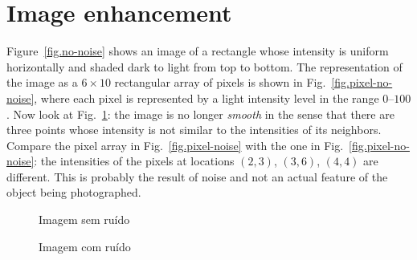 \section{Image enhancement}\label{s.enhance}

Figure~\ref{fig.no-noise} shows an image of a rectangle whose intensity is uniform horizontally and shaded dark to light from top to bottom. The representation of the image as a $6\times 10$ rectangular array of pixels is shown in Fig.~\ref{fig.pixel-no-noise}, where each pixel is represented by a light intensity level in the range $0$--$100$. Now look at Fig.~\ref{fig.noise}: the image is no longer \emph{smooth} in the sense that there are three points whose intensity is not similar to the intensities of its neighbors. Compare the pixel array in Fig.~\ref{fig.pixel-noise} with the one in Fig.~\ref{fig.pixel-no-noise}: the intensities of the pixels at locations $(2,3)$, $(3,6)$, $(4,4)$ are different. This is probably the result of noise and not an actual feature of the object being photographed. 

\begin{figure}
\begin{minipage}{.45\textwidth}
\caption{Imagem sem ruído}\label{fig.no-noise}
\end{minipage}
\hspace{\fill}
\begin{minipage}{.45\textwidth}
\caption{Imagem com ruído}\label{fig.noise}
\end{minipage}
\end{figure}


